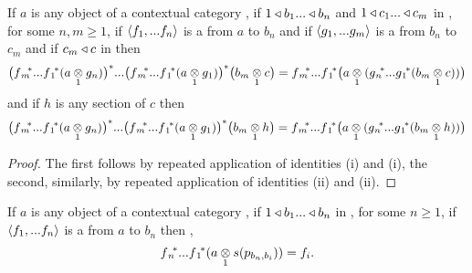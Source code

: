 \begin{lemma} 
If $a$ is any object of a contextual category \catcw, if $1 \base b_1 ... \base b_n$ and $1 \base c_1 ... \base c_m$ in \catc, for some $n,m \ge 1$, 
if $\tuple{\fn}$ is a  from $a$ to $b_n$ and
if $\tuple{\gm}$ is a  from $b_n$ to $c_m$ and if  $c_m \base c$ in \catcw then
\begin{equation}
\label{cascadedpullbackscohereonobjects}
\big(\fmvectorstar (\crossx{a}{g_n}{1})\big)^* ... \big(\fmvectorstar (\crossx{a}{g_1}{1})\big) ^* \big(\crossx{b_m}{c}{1}\big) 
= \fmvectorstar \big(  \crossx{a}{(\gnvectorstar(\crossx{b_m}{c}{1}))}{1} \big)                                    
\end{equation}
and if  $h$ is any section of $c$ then 
\begin{equation}
\label{cascadedpullbackscohereonsections}
\big(\fmvectorstar (\crossx{a}{g_n}{1})\big)^* ... \big(\fmvectorstar (\crossx{a}{g_1}{1})\big) ^* \big(\crossx{b_m}{h}{1}\big) 
= \fmvectorstar \big(  \crossx{a}{(\gnvectorstar(\crossx{b_m}{h}{1}))}{1} \big)                                    
\end{equation}
\end{lemma}
\begin{proof}
The first follows by repeated application of identities  (i) and  (i), 
the second, similarly, by repeated application of identities  (ii) and  (ii).
\end{proof}
\begin{lemma}
If $a$ is any object of a contextual category \catcw, if $1 \base b_1 ... \base b_n$ in \catc, for some $n \ge 1$, 
if $\tuple{\fn}$ is a  from $a$ to $b_n$ then \foreachi,
\begin{equation}
\fnvectorstar(\crossx{a}{s(p_{b_n,b_i})}{1})=f_i.                                    
\end{equation}
\end{lemma}